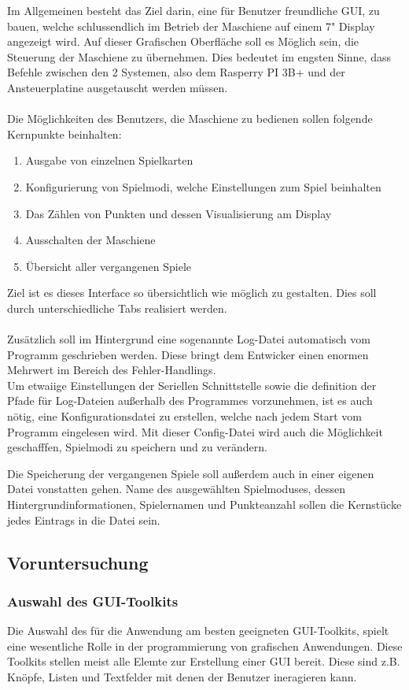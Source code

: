 Im Allgemeinen besteht das Ziel darin, eine für Benutzer freundliche GUI, zu bauen, welche schlussendlich im Betrieb der Maschiene auf einem 7" Display angezeigt wird. Auf dieser Grafischen Oberfläche soll es Möglich sein, die Steuerung der Maschiene zu übernehmen.
Dies bedeutet im engsten Sinne, dass Befehle zwischen den 2 Systemen, also dem Rasperry PI 3B+ und der Ansteuerplatine ausgetauscht werden müssen.\\\\
Die Möglichkeiten des Benutzers, die Maschiene zu bedienen sollen folgende Kernpunkte beinhalten:
\begin{enumerate}
    \item Ausgabe von einzelnen Spielkarten
    \item Konfigurierung von Spielmodi, welche Einstellungen zum Spiel beinhalten
    \item Das Zählen von Punkten und dessen Visualisierung am Display
    \item Ausschalten der Maschiene
    \item Übersicht aller vergangenen Spiele
\end{enumerate}
Ziel ist es dieses Interface so übersichtlich wie möglich zu gestalten. Dies soll durch unterschiedliche Tabs realisiert werden.\\\\
Zusätzlich soll im Hintergrund eine sogenannte Log-Datei automatisch vom Programm geschrieben werden. Diese bringt dem Entwicker einen enormen Mehrwert im Bereich des Fehler-Handlings. \\
Um etwaiige Einstellungen der Seriellen Schnittstelle sowie die definition der Pfade für Log-Dateien außerhalb des Programmes vorzunehmen, ist es auch nötig, eine Konfigurationsdatei zu erstellen, welche nach jedem Start vom Programm eingelesen wird. Mit dieser Config-Datei wird auch die Möglichkeit geschafffen,
Spielmodi zu speichern und zu verändern.

Die Speicherung der vergangenen Spiele soll außerdem auch in einer eigenen Datei vonstatten gehen. Name des ausgewählten Spielmoduses, dessen Hintergrundinformationen, Spielernamen und Punkteanzahl sollen die Kernstücke jedes Eintrags in die Datei sein.\newpage

\subsection{Voruntersuchung}\label{subsec:voruntersuchung}

\subsubsection{Auswahl des GUI-Toolkits}
Die Auswahl des für die Anwendung am besten geeigneten GUI-Toolkits, spielt eine wesentliche Rolle in der programmierung von grafischen Anwendungen. Diese Toolkits stellen meist alle Elemte zur Erstellung einer GUI bereit. Diese sind z.B. Knöpfe, Listen und Textfelder mit denen der Benutzer ineragieren kann.

